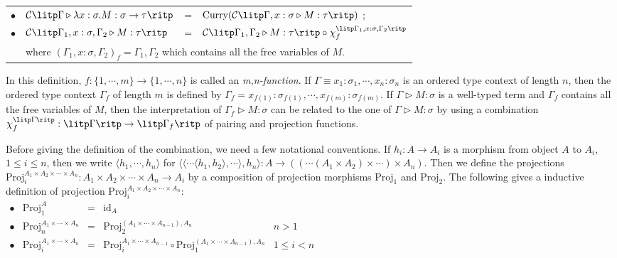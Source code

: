 \begin{definition}
\begin{myitemize}
\begin{tabular}{rlcl}
  $ \bullet $ & $ \mathcal{C} \litp \Gamma \triangleright \lambda x: \sigma .M: \sigma \to \tau \ritp $ & = & $ \text{Curry}( \mathcal{C} \litp \Gamma , x: \sigma \triangleright M: \tau \ritp ) $ ; \\[5pt]
  $ \bullet $ & $ \mathcal{C} \litp \Gamma _1 , x: \sigma , \Gamma _2 \triangleright M: \tau \ritp $ & = & $ \mathcal{C} \litp \Gamma _1 , \Gamma _2 \triangleright M: \tau \ritp \circ \chi_f^{\litp \Gamma _1 , x: \sigma , \Gamma _2 \ritp} $ \\[5pt]
  & \multicolumn{3}{l}{where $ ( \Gamma _1 , x: \sigma , \Gamma _2 )_f = \Gamma _1 , \Gamma _2 $ which contains all the free variables of $ M $.} \\[5pt]
  \end{tabular}
\end{myitemize}
\end{definition}

In this definition, $ f: \{ 1, \cdots , m \} \to \{ 1, \cdots , n \} $ is called an \emph{m,n-function}. If $ \Gamma \equiv x_1:\sigma_1, \cdots , x_n:\sigma_n $ is an ordered type context of length $ n $, then the ordered type context $ \Gamma_f $ of length $ m $ is defined by $ \Gamma_f = x_{f(1)}:\sigma_{f(1)}, \cdots , x_{f(m)}:\sigma_{f(m)} $. If $ \Gamma \triangleright M: \sigma $ is a well-typed term and $ \Gamma_f $ contains all the free variables of $ M $, then the interpretation of $ \Gamma_f \triangleright M: \sigma $ can be related to the one of $ \Gamma \triangleright M: \sigma $ by using a combination $ \chi_f^{\litp \Gamma \ritp} : \litp \Gamma \ritp \to \litp \Gamma_f \ritp $ of pairing and projection functions.

Before giving the definition of the combination, we need a few notational conventions. If $ h_i:A \to A_i $ is a morphism from object $ A $ to $ A_i $, $ 1 \leq i \leq n $, then we write $ \langle h_1, \cdots , h_n \rangle $ for $ \langle \langle \cdots \langle h_1,h_2 \rangle, \cdots \rangle , h_n \rangle : A \to (( \cdots (A_1 \times A_2) \times \cdots ) \times A_n ) $. Then we define the projections $ \text{Proj}_i^{A_1 \times A_2 \times \cdots \times A_n} : A_1 \times A_2 \times \cdots \times A_n \to A_i $ by a composition of projection morphisms $ \text{Proj}_1 $ and $ \text{Proj}_2 $. The following gives a inductive definition of projection $ \text{Proj}_i^{A_1 \times A_2 \times \cdots \times A_n} $:\\[5pt]
$
\begin{array}{rlcll}
\bullet & \text{Proj}_1^{A} & = & \text{id}_A & \\[5pt]
\bullet & \text{Proj}_n^{A_1 \times \cdots \times A_n} & = & \text{Proj}_2^{(A_1 \times \cdots \times A_{n-1}), A_n} & n > 1 \\[5pt]
\bullet & \text{Proj}_i^{A_1 \times \cdots \times A_n} & = & \text{Proj}_i^{A_1 \times \cdots \times A_{n-1}} \circ \text{Proj}_1^{(A_1 \times \cdots \times A_{n-1}), A_n} & 1 \leq i < n \\[10pt]
\end{array}
$

